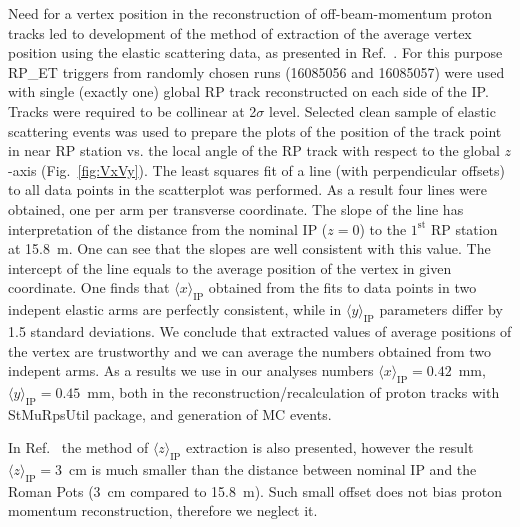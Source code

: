 Need for a vertex position in the reconstruction of off-beam-momentum proton tracks led to development of the method  of extraction of the average vertex position using the elastic scattering data, as presented in Ref.~\cite{AverageVertex}. For this purpose RP\_ET triggers from randomly chosen runs (16085056 and 16085057) were used with single (exactly one) global RP track reconstructed on each side of the IP. Tracks were required to be collinear at 2$\sigma$ level. Selected clean sample of elastic scattering events was used to prepare the plots of the position of the track point in near RP station vs. the local angle of the RP track with respect to the global $z$-axis (Fig.~\ref{fig:VxVy}). The least squares fit of a line (with perpendicular offsets) to all data points in the scatterplot was performed. As a result four lines were obtained, one per arm per transverse coordinate. The slope of the line has interpretation of the distance from the nominal IP ($z=0$) to the $1^{\text{st}}$ RP station at 15.8~m. One can see that the slopes are well consistent with this value. The intercept of the line equals to the average position of the vertex in given coordinate. One finds that $\langle x\rangle_{\text{IP}}$ obtained from the fits to data points in two indepent elastic arms are perfectly consistent, while in $\langle y\rangle_{\text{IP}}$ parameters differ by 1.5 standard deviations. We conclude that extracted values of average positions of the vertex are trustworthy and we can average the numbers obtained from two indepent arms. As a results we use in our analyses numbers $\langle x\rangle_{\text{IP}} = 0.42$~mm, $\langle y\rangle_{\text{IP}} = 0.45$~mm, both in the reconstruction/recalculation of proton tracks with StMuRpsUtil package, and generation of MC events.

In Ref.~\cite{AverageVertex} the method of $\langle z\rangle_{\text{IP}}$ extraction is also presented, however the result $\langle z\rangle_{\text{IP}}= 3$~cm is much smaller than the distance between nominal IP and the Roman Pots (3~cm compared to 15.8~m). Such small offset does not bias proton momentum reconstruction, therefore we neglect it.

